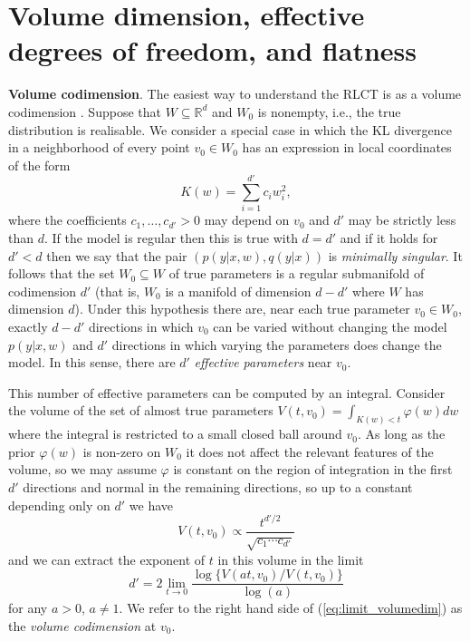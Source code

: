 \documentclass{article} %
\def\be{\begin{equation}}
\def\ee{\end{equation}}
\begin{document}
\section{Volume dimension, effective degrees of freedom, and flatness}
\label{section:no_flat_minima}

\textbf{Volume codimension}. The easiest way to understand the RLCT is as a volume codimension \citep[Theorem 7.1]{watanabe_algebraic_2009}.  Suppose that $W \subseteq \mathbb{R}^d$ and $W_0$ is nonempty, i.e., the true distribution is realisable. We consider a special case in which the KL divergence in a neighborhood of every point $v_0 \in W_0$ has an expression in local coordinates of the form
\begin{equation}\label{eq:local_Kw}
K(w) = \sum_{i=1}^{d'} c_i w_i^2,
\end{equation} %
where the coefficients $c_1,\ldots,c_{d'} > 0$ may depend on $v_0$ and $d'$ may be strictly less than $d$. If the model is regular then this is true with $d = d'$ and if it holds for $d' < d$ then we say that the pair $(p(y|x,w),q(y|x))$ is \emph{minimally singular}. It follows that the set $W_0 \subseteq W$ of true parameters is a regular submanifold of codimension $d'$ (that is, $W_0$ is a manifold of dimension $d - d'$ where $W$ has dimension $d$). Under this hypothesis there are, near each true parameter $v_0 \in W_0$, exactly $d - d'$ directions in which $v_0$ can be varied without changing the model $p(y|x,w)$ and $d'$ directions in which varying the parameters does change the model. In this sense, there are $d'$ \emph{effective parameters} near $v_0$. 

This number of effective parameters can be computed by an integral. Consider the volume of the set of almost true parameters
$
V(t,v_0) = \int_{K(w) < t} \varphi(w) dw
$
where the integral is restricted to a small closed ball around $v_0$. As long as the prior $\varphi(w)$ is non-zero on $W_0$ it does not affect the relevant features of the volume, so we may assume $\varphi$ is constant on the region of integration in the first $d'$ directions and normal in the remaining directions, so up to a constant depending only on $d'$ we have
\begin{equation}\label{eq:volume_singular}
V(t,v_0) \propto  \frac{t^{d'/2}}{\sqrt{c_1 \cdots c_{d'}}}
\end{equation}
and we can extract the exponent of $t$ in this volume in the limit
\be\label{eq:limit_volumedim}
d' = 2 \lim_{t \to 0} \frac{\log\big\{V(at,v_0)/V(t,v_0)\big\}}{\log(a)}
\ee
for any $a > 0$, $a \neq 1$. We refer to the right hand side of (\ref{eq:limit_volumedim}) as the \emph{volume codimension} at $v_0$. 
\end{document}
